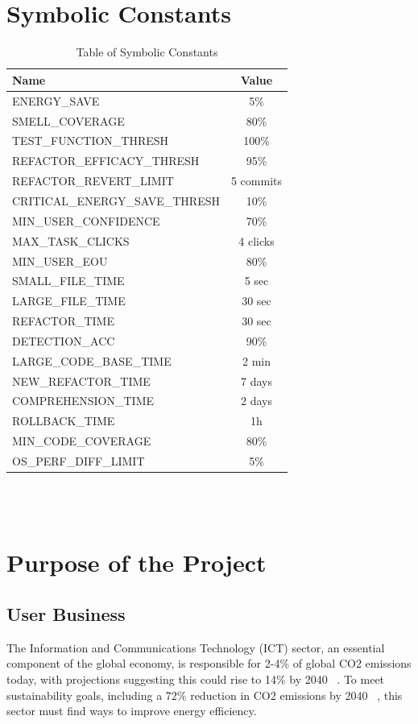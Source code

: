 \documentclass[12pt]{article}
\begin{document}
~\\

~\newpage

\section*{Symbolic Constants}
\begin{table}[H]
  \centering
  \begin{tabular}{|l|c|}
    \toprule \textbf{Name} & \textbf{Value} \\
    \midrule
    ENERGY\_SAVE & 5\% \\
    SMELL\_COVERAGE & 80\% \\
    TEST\_FUNCTION\_THRESH & 100\% \\
    REFACTOR\_EFFICACY\_THRESH & 95\% \\
    REFACTOR\_REVERT\_LIMIT & 5 commits \\
    CRITICAL\_ENERGY\_SAVE\_THRESH & 10\% \\
    MIN\_USER\_CONFIDENCE & 70\% \\
    MAX\_TASK\_CLICKS & 4 clicks \\
    MIN\_USER\_EOU & 80\% \\
    SMALL\_FILE\_TIME & 5 sec \\
    LARGE\_FILE\_TIME & 30 sec \\
    REFACTOR\_TIME & 30 sec \\
    DETECTION\_ACC & 90\% \\
    LARGE\_CODE\_BASE\_TIME & 2 min \\
    NEW\_REFACTOR\_TIME & 7 days \\
    COMPREHENSION\_TIME & 2 days \\
    ROLLBACK\_TIME & 1h \\
    MIN\_CODE\_COVERAGE & 80\% \\
    OS\_PERF\_DIFF\_LIMIT & 5\% \\
    \bottomrule
  \end{tabular}
  \caption{Table of Symbolic Constants}
  \label{tab:syms}
\end{table}

~\\

~\newpage


\section{Purpose of the Project}
\subsection{User Business}
The Information and Communications Technology (ICT) sector, an
essential component of the global economy, is responsible for 2-4\%
of global CO2 emissions today, with projections suggesting this could
rise to 14\% by 2040 ~\citep{BelkhirAndElmeligi2018}. To meet
sustainability goals, including a 72\% reduction in CO2 emissions by
2040 ~\citep{FreitagAndBernersLee2021}, this sector must find ways to
improve energy efficiency.
\end{document}
